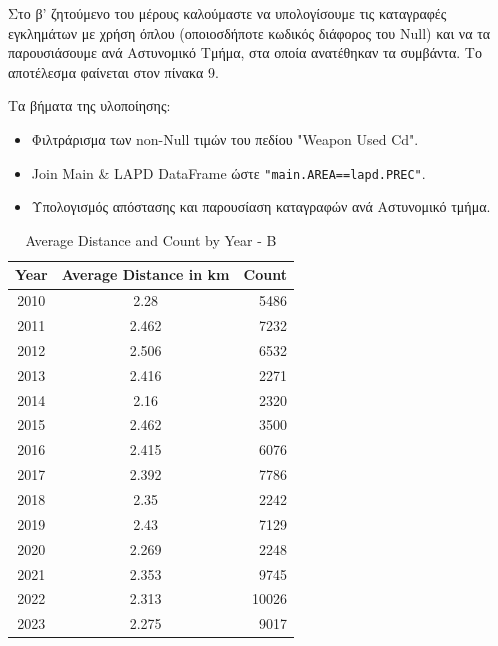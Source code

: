 \documentclass{article}
\begin{document}
Στο β' ζητούμενο του μέρους καλούμαστε να υπολογίσουμε τις καταγραφές εγκλημάτων με χρήση όπλου (οποιοσδήποτε κωδικός διάφορος του Null) και να τα παρουσιάσουμε ανά Αστυνομικό Τμήμα, στα οποία ανατέθηκαν τα συμβάντα. Το αποτέλεσμα φαίνεται στον πίνακα 9. 

\clearpage
Τα βήματα της υλοποίησης:
\begin{itemize}
    \item   Φιλτράρισμα των  non-Null  τιμών του πεδίου  "Weapon Used Cd".
    \item   Join Main \& LAPD DataFrame  ώστε  \texttt{"main.AREA==lapd.PREC"}.
    \item   {}Υπολογισμός απόστασης και παρουσίαση καταγραφών ανά Αστυνομικό τμήμα.
\end{itemize}


\begin{table}[ht]
\centering
\begin{tabular}{|c|c|r|}
\hline
Year & Average Distance in km & Count \\ \hline
2010 & 2.28   & 5486  \\ \hline
2011 & 2.462  & 7232  \\ \hline
2012 & 2.506  & 6532  \\ \hline
2013 & 2.416  & 2271  \\ \hline
2014 & 2.16   & 2320  \\ \hline
2015 & 2.462  & 3500  \\ \hline
2016 & 2.415  & 6076  \\ \hline
2017 & 2.392  & 7786  \\ \hline
2018 & 2.35   & 2242  \\ \hline
2019 & 2.43   & 7129  \\ \hline
2020 & 2.269  & 2248  \\ \hline
2021 & 2.353  & 9745  \\ \hline
2022 & 2.313  & 10026 \\ \hline
2023 & 2.275  & 9017  \\ \hline
\end{tabular}
\caption{Average Distance and Count by Year - B}
\label{table:year_distance_count_b}
\end{table}
\end{document}
